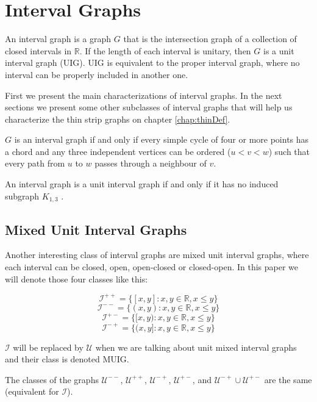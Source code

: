 \chapter{Interval Graphs}

An interval graph is a graph $G$ that is the intersection graph of a collection
of closed intervals in $\mathbb{R}$. If the length of each interval is unitary,
then $G$ is a unit interval graph (UIG). UIG is equivalent to the proper interval graph, where no interval can be properly included in another one.

First we present the main characterizations of interval graphs. In the next sections we present some other subclasses of interval graphs that will help us characterize the thin strip graphs on chapter \ref{chap:thinDef}.

\begin{theorem}
  \label{theo:intervalChord}
  $G$ is an interval graph if and only if every simple cycle of four or more
  points has a chord and any three independent vertices can be ordered ($u<v<w$) such that every path from $u$ to $w$ passes through a neighbour of $v$.
\end{theorem}

\begin{theorem}
  An interval graph is a unit interval graph if and only if it has no induced subgraph $K_{1,3}$ \cite{roberts1968representations}.
\end{theorem}

\section{Mixed Unit Interval Graphs}
\label{sec:muig}

Another interesting class of interval graphs are mixed unit interval graphs, where each
interval can be closed, open, open-closed or closed-open. In this paper we will
denote those four classes like this:

$$\mathcal{I}^{++} = \{[x,y] : x,y \in \mathbb{R}, x\leq y\}$$
$$\mathcal{I}^{--} = \{(x,y) : x,y \in \mathbb{R}, x\leq y\}$$
$$\mathcal{I}^{+-} = \{[x,y) : x,y \in \mathbb{R}, x\leq y\}$$
$$\mathcal{I}^{-+} = \{(x,y] : x,y \in \mathbb{R}, x\leq y\}$$

$\mathcal{I}$ will be replaced by $\mathcal{U}$ when we are talking about unit
mixed interval graphs and their class is denoted MUIG.

\begin{theorem}
  The classes of the graphs $\mathcal{U}^{--}$, $\mathcal{U}^{++}$,
  $\mathcal{U}^{-+}$, $\mathcal{U}^{+-}$, and  $\mathcal{U}^{-+} \cup
  \mathcal{U}^{+-}$ are the same (equivalent for $\mathcal{I}$). \cite{DOURADO20123357}
\end{theorem}

